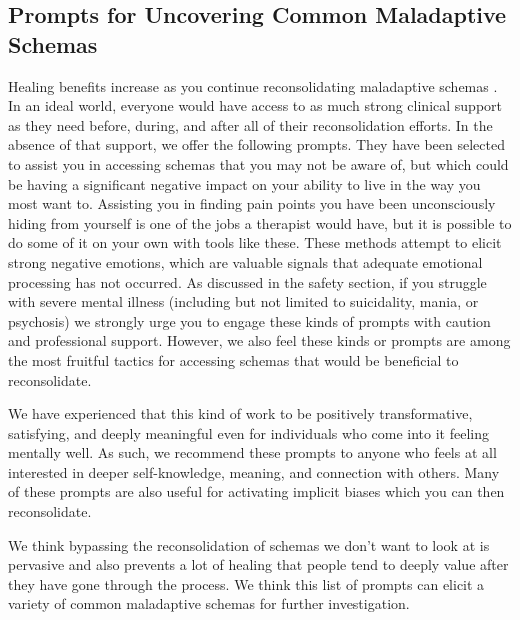 \documentclass[12pt,letterpaper]{article}
\begin{document}
\subsection{Prompts for Uncovering Common Maladaptive Schemas}
\label{uncovering}
Healing benefits increase as you continue reconsolidating maladaptive schemas \cite{rachmanProcessing}. In an ideal world, everyone would have access to as much strong clinical support as they need before, during, and after all of their reconsolidation efforts. In the absence of that support, we offer the following prompts. They have been selected to assist you in accessing schemas that you may not be aware of, but which could be having a significant negative impact on your ability to live in the way you most want to. Assisting you in finding pain points you have been unconsciously hiding from yourself is one of the jobs a therapist would have, but it is possible to do some of it on your own with tools like these. These methods attempt to elicit strong negative emotions, which are valuable signals that adequate emotional processing has not occurred. As discussed in the safety section, if you struggle with severe mental illness (including but not limited to suicidality, mania, or psychosis) we strongly urge you to engage these kinds of prompts with caution and professional support. However, we also feel these kinds or prompts are among the most fruitful tactics for accessing schemas that would be beneficial to reconsolidate.

We have experienced that this kind of work to be positively transformative, satisfying, and deeply meaningful even for individuals who come into it feeling mentally well. As such, we recommend these prompts to anyone who feels at all interested in deeper self-knowledge, meaning, and connection with others. Many of these prompts are also useful for activating implicit biases which you can then reconsolidate.

We think bypassing the reconsolidation of schemas we don't want to look at is pervasive and also prevents a lot of healing that people tend to deeply value after they have gone through the process. We think this list of prompts can elicit a variety of common maladaptive schemas for further investigation.


\vspace{\baselineskip}
\end{document}
